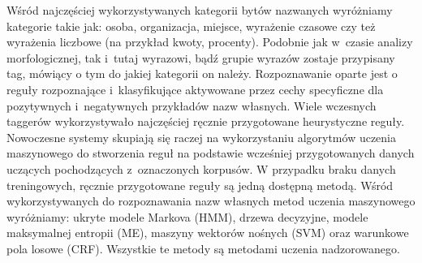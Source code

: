 \documentclass[a4paper, twoside, openright, 12pt]{report}
\begin{document}
                Wśród najczęściej wykorzystywanych kategorii bytów nazwanych wyróżniamy kategorie
                takie jak: osoba, organizacja, miejsce, wyrażenie czasowe czy też wyrażenia liczbowe (na przykład kwoty, procenty).
                Podobnie jak w~czasie analizy morfologicznej, tak i~tutaj wyrazowi, bądź grupie wyrazów zostaje przypisany
                tag, mówiący o tym do jakiej kategorii on należy. Rozpoznawanie oparte jest o reguły rozpoznające i~klasyfikujące
                aktywowane przez cechy specyficzne dla pozytywnych i~negatywnych przykładów nazw własnych. Wiele wczesnych
                taggerów wykorzystywało najczęściej ręcznie przygotowane heurystyczne reguły. Nowoczesne systemy skupiają się
                raczej na wykorzystaniu algorytmów uczenia maszynowego do stworzenia reguł na podstawie wcześniej przygotowanych
                danych uczących pochodzących z~oznaczonych korpusów. W przypadku braku danych treningowych, ręcznie przygotowane
                reguły są jedną dostępną metodą. Wśród wykorzystywanych do rozpoznawania nazw własnych metod uczenia maszynowego
                wyróżniamy: ukryte modele Markova (HMM), drzewa decyzyjne, modele maksymalnej entropii (ME), maszyny wektorów nośnych (SVM)
                oraz warunkowe pola losowe (CRF). Wszystkie te metody są metodami uczenia nadzorowanego\cite{NERSURVEY}.
\end{document}
